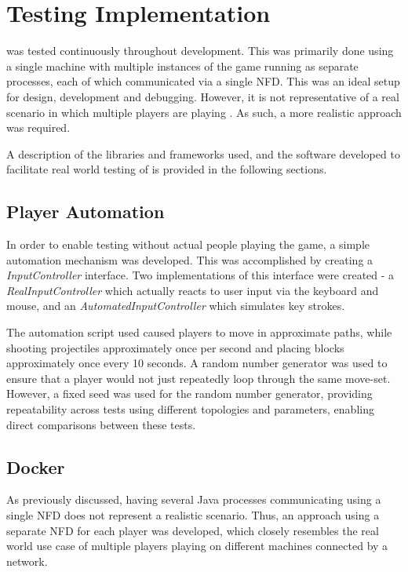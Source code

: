 \chapter{Testing Implementation}
\game{} was tested continuously throughout development. This was primarily done using a single machine with multiple instances of the game running as separate processes, each of which communicated via a single NFD. This was an ideal setup for design, development and debugging. However, it is not representative of a real scenario in which multiple players are playing \game{}. As such, a more realistic approach was required. 

A description of the libraries and frameworks used, and the software developed to facilitate real world testing of \game{} is provided in the following sections.



\section{Player Automation}\label{sec:impl:automation}
In order to enable testing without actual people playing the game, a simple automation mechanism was developed. This was accomplished by creating a \textit{InputController} interface. Two implementations of this interface were created - a \textit{RealInputController} which actually reacts to user input via the keyboard and mouse, and an \textit{AutomatedInputController} which simulates key strokes.

The automation script used caused players to move in approximate paths, while shooting projectiles approximately once per second and placing blocks approximately once every 10 seconds. A random number generator was used to ensure that a player would not just repeatedly loop through the same move-set. However, a fixed seed was used for the random number generator, providing repeatability across tests using different topologies and parameters, enabling direct comparisons between these tests. 


\section{Docker}\label{sec:impl:test:docker}
As previously discussed, having several Java processes communicating using a single NFD does not represent a realistic scenario. Thus, an approach using a separate NFD for each player was developed, which closely resembles the real world use case of multiple players playing on different machines connected by a network.

